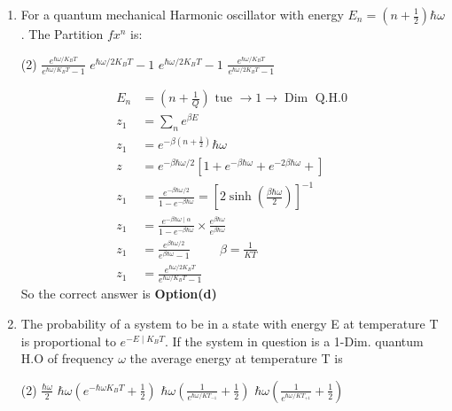 \begin{enumerate}
\begin{answer}
\end{answer}	
\item For a quantum mechanical Harmonic oscillator with energy $E_{n}=\left(n+\frac{1}{2}\right) \hbar \omega$. The Partition $f x^{n}$ is:
\begin{tasks}(2)
	\task[\textbf{a.}]$\frac{e^{\hbar\omega/K_BT}}{e^{\hbar\omega/K_BT}-1}$
	\task[\textbf{b.}]$e^{\hbar \omega / 2 K_{B} T}-1$
	\task[\textbf{c.}]$e^{\hbar  \omega / 2 K_{B} T}-1$
	\task[\textbf{d.}] $\frac{e^{\hbar\omega/K_BT}}{e^{\hbar\omega/2K_BT}-1}$
\end{tasks}
\begin{answer}
	\begin{align*}
	E_{n}&=\left(n+\frac{1}{Q}\right) \text { tue } \rightarrow 1 \rightarrow \operatorname{Dim} \text { Q.H.0 }\\
	z_{1}&=\sum_{n} e^{\beta E}\\
	z_1&=e^{-\beta\left(n+\frac{1}{2} \right) }\hbar \omega\\
	z&=e^{-\beta \hbar \omega / 2}\left[1+e^{-\beta \hbar \omega}+e^{-2 \beta \hbar \omega}+\right]\\
	z_{1}&=\frac{e^{-\beta \hbar \omega / 2}}{1-e^{-\beta \hbar \omega}}=\left[2 \sinh \left(\frac{\beta \hbar \omega}{2}\right)\right]^{-1}\\
	z_{1}&=\frac{e^{-\beta \hbar \omega \mid \alpha}}{1-e^{-\beta \hbar \omega}} \times \frac{e^{\beta \hbar \omega}}{e^{\beta \hbar \omega}}\\
	z_{1}&=\frac{e^{\beta \hbar \omega / 2}}{e^{\beta \hbar \omega}-1}\hspace{1cm} \beta=\frac{1}{K T}\\
	z_{1}&=\frac{e^{\hbar \omega / 2 K_{B} T}}{e^{\hbar \omega / K_{B} T}-1}
	\end{align*}
	So the correct answer is \textbf{Option(d)}
\end{answer}
\item 	The probability of a system to be in a state with energy E at temperature T is proportional to $e^{-E \mid K_{B} T}$. If the system in question is a 1-Dim. quantum H.O of frequency $\omega$ the average energy at temperature T is
	\begin{tasks}(2)
		\task[\textbf{a.}]$\frac{\hbar\omega}{2}$
		\task[\textbf{b.}]$\hbar \omega\left(e^{-\hbar \omega K_{B} T}+\frac{1}{2}\right)$
		\task[\textbf{c.}]$\hbar \omega\left(\frac{1}{e^{\hbar\omega/KT_{-1}}}+\frac{1}{2}\right)$
		\task[\textbf{d.}] $\hbar \omega\left(\frac{1}{e^{\hbar\omega/KT_{+1}}}+\frac{1}{2}\right)$
	\end{tasks}

\end{enumerate}
